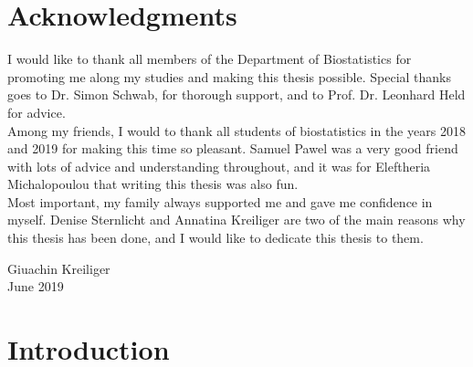 \documentclass[11pt,a4paper,twoside]{book}\usepackage[]{graphicx}\usepackage[]{color}
\begin{document}
\chapter*{Acknowledgments}
\thispagestyle{plain}
I would like to thank all members of the Department of Biostatistics for promoting me along my studies and making this thesis possible.
Special thanks goes to Dr. Simon Schwab, for thorough support, and to Prof. Dr. Leonhard Held for advice.\\
Among my friends, I would to thank all students of biostatistics in the years 2018 and 2019 for making this time so pleasant. Samuel
Pawel was a very good friend with lots of advice and understanding throughout, and it was for Eleftheria Michalopoulou 
that writing this thesis was also fun.\\
Most important, my family always supported me and gave me confidence in myself. Denise Sternlicht and
Annatina Kreiliger are two of the main reasons why this thesis has been done, and I would like to dedicate this
thesis to them.

\bigskip

\begin{flushright}
  Giuachin Kreiliger\\
  June 2019
\end{flushright}



\thispagestyle{plain}
\tableofcontents
{}








{}






\chapter{Introduction}
\end{document}
